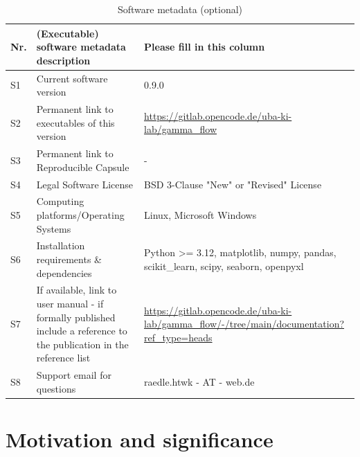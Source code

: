 \documentclass[review, 12pt, a4paper]{elsarticle}
\begin{document}
\begin{table}[!ht]
\begin{tabular}{|l|p{6.5cm}|p{6.5cm}|}
\hline
\textbf{Nr.} & \textbf{(Executable) software metadata description} & \textbf{Please fill in this column} \\
\hline
S1 & Current software version & 0.9.0 \\
\hline
S2 & Permanent link to executables of this version  & \url{https://gitlab.opencode.de/uba-ki-lab/gamma_flow} \\
\hline
S3  & Permanent link to Reproducible Capsule & - \\
\hline
S4 & Legal Software License & BSD 3-Clause "New" or "Revised" License \\
\hline
S5 & Computing platforms/Operating Systems & Linux, Microsoft Windows\\
\hline
S6 & Installation requirements \& dependencies & Python >= 3.12, matplotlib, numpy, pandas, scikit\_learn, scipy, seaborn, openpyxl \\
\hline
S7 & If available, link to user manual - if formally published include a reference to the publication in the reference list &  \url{https://gitlab.opencode.de/uba-ki-lab/gamma_flow/-/tree/main/documentation?ref_type=heads} \\
\hline
S8 & Support email for questions & raedle.htwk - AT - web.de\\
\hline
\end{tabular}
\caption{Software metadata (optional)}
\label{executabelMetadata} 
\end{table}


\section{Motivation and significance}
\end{document}
